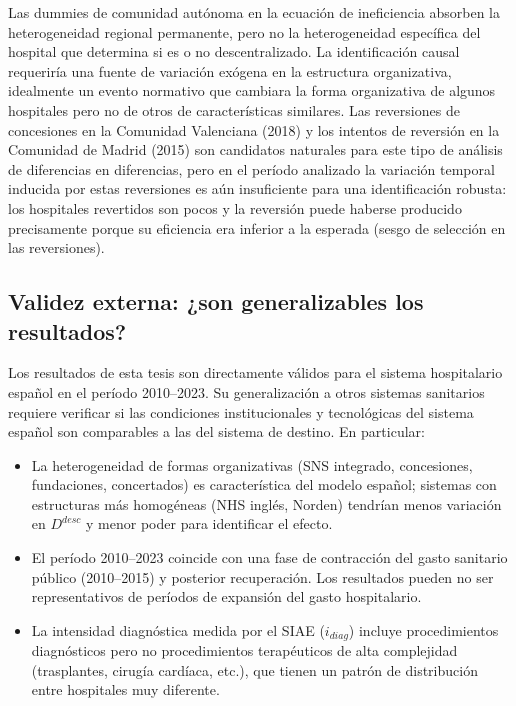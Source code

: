 Las dummies de comunidad autónoma en la ecuación de ineficiencia absorben la heterogeneidad regional permanente, pero no la heterogeneidad específica del hospital que determina si es o no descentralizado. La identificación causal requeriría una fuente de variación exógena en la estructura organizativa, idealmente un evento normativo que cambiara la forma organizativa de algunos hospitales pero no de otros de características similares. Las reversiones de concesiones en la Comunidad Valenciana (2018) y los intentos de reversión en la Comunidad de Madrid (2015) son candidatos naturales para este tipo de análisis de diferencias en diferencias, pero en el período analizado la variación temporal inducida por estas reversiones es aún insuficiente para una identificación robusta: los hospitales revertidos son pocos y la reversión puede haberse producido precisamente porque su eficiencia era inferior a la esperada (sesgo de selección en las reversiones).

\subsection{Validez externa: ¿son generalizables los resultados?}

Los resultados de esta tesis son directamente válidos para el sistema hospitalario español en el período 2010--2023. Su generalización a otros sistemas sanitarios requiere verificar si las condiciones institucionales y tecnológicas del sistema español son comparables a las del sistema de destino. En particular:

\begin{itemize}
  \item La heterogeneidad de formas organizativas (SNS integrado, concesiones, fundaciones, concertados) es característica del modelo español; sistemas con estructuras más homogéneas (NHS inglés, Norden) tendrían menos variación en $D^{desc}$ y menor poder para identificar el efecto.
  \item El período 2010--2023 coincide con una fase de contracción del gasto sanitario público (2010--2015) y posterior recuperación. Los resultados pueden no ser representativos de períodos de expansión del gasto hospitalario.
  \item La intensidad diagnóstica medida por el SIAE ($i_{diag}$) incluye procedimientos diagnósticos pero no procedimientos terapéuticos de alta complejidad (trasplantes, cirugía cardíaca, etc.), que tienen un patrón de distribución entre hospitales muy diferente.
\end{itemize}

